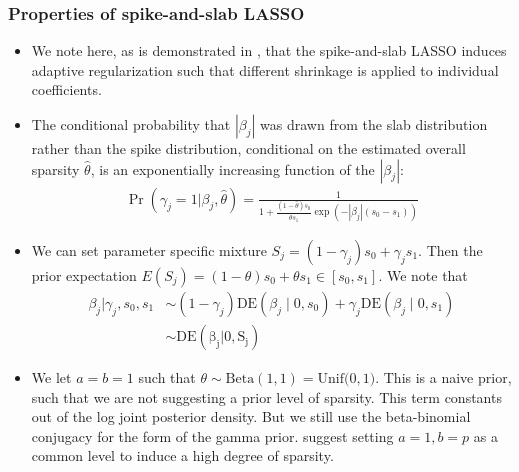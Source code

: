\documentclass[11pt,a4paper]{article}
\let\cite\parencite
\begin{document}
\subsubsection{Properties of spike-and-slab LASSO}
\begin{itemize}
    \item We note here, as is demonstrated in \cite{RockovaGeorge2018}, that the spike-and-slab LASSO induces adaptive regularization such that different shrinkage is applied to individual coefficients. 

    \item The conditional probability that $|\beta_j|$ was drawn from the slab distribution rather than the spike distribution, conditional on the estimated overall sparsity $\hat\theta$, is an exponentially increasing function of the $|\beta_j|$:
\begin{align*}
    \Pr(\gamma_j = 1|\beta_j, \hat{\theta}) = \frac{1}{1+\frac{(1-\hat \theta)s_0}{\hat \theta s_1}\exp(-|\beta_j|(s_0-s_1))}
\end{align*}

\item We can set parameter specific mixture $S_j = (1-\gamma_j)s_0 + \gamma_js_1$. Then the prior expectation $E(S_j) = (1-\theta)s_0 + \theta s_1 \in [s_0,s_1]$. We note that \begin{align*}
    \beta_j | \gamma_j, s_0, s_1 &\sim (1 - \gamma_j)\text{DE}(\beta_j \mid 0, s_0) + \gamma_j\text{DE}(\beta_j \mid 0, s_1) 
    \\ & \sim \mathrm{DE(\beta_j|0, S_j)}
\end{align*}

\item We let $a=b=1$ such that $\theta \sim \mathrm{Beta}(1,1) = \mathrm{Unif(0,1})$. This is a naive prior, such that we are not suggesting a prior level of sparsity. This term constants out of the log joint posterior density. But we still use the beta-binomial conjugacy for the form of the gamma prior. \cite{Castillo2012, RockovaGeorge2018} suggest setting $a=1, b=p$ as a common level to induce a high degree of sparsity.

\end{itemize}
\end{document}
